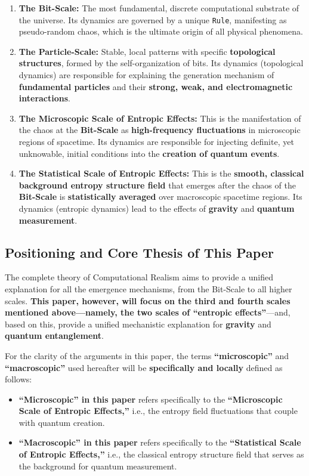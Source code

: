 \documentclass[11pt]{article}
\begin{document}
\begin{enumerate}
    \item   \textbf{The Bit-Scale:} The most fundamental, discrete computational substrate of the universe. Its dynamics are governed by a unique \texttt{Rule}, manifesting as pseudo-random chaos, which is the ultimate origin of all physical phenomena.
    
    \item   \textbf{The Particle-Scale:} Stable, local patterns with specific \textbf{topological structures}, formed by the self-organization of bits. Its dynamics (topological dynamics) are responsible for explaining the generation mechanism of \textbf{fundamental particles} and their \textbf{strong, weak, and electromagnetic interactions}.
    
    \item   \textbf{The Microscopic Scale of Entropic Effects:} This is the manifestation of the chaos at the \textbf{Bit-Scale} as \textbf{high-frequency fluctuations} in microscopic regions of spacetime. Its dynamics are responsible for injecting definite, yet unknowable, initial conditions into the \textbf{creation of quantum events}.
    
    \item   \textbf{The Statistical Scale of Entropic Effects:} This is the \textbf{smooth, classical background entropy structure field} that emerges after the chaos of the \textbf{Bit-Scale} is \textbf{statistically averaged} over macroscopic spacetime regions. Its dynamics (entropic dynamics) lead to the effects of \textbf{gravity} and \textbf{quantum measurement}.
\end{enumerate}

\subsection{Positioning and Core Thesis of This Paper}

The complete theory of Computational Realism aims to provide a unified explanation for all the emergence mechanisms, from the Bit-Scale to all higher scales. \textbf{This paper, however, will focus on the third and fourth scales mentioned above—namely, the two scales of ``entropic effects''}—and, based on this, provide a unified mechanistic explanation for \textbf{gravity} and \textbf{quantum entanglement}.

For the clarity of the arguments in this paper, the terms \textbf{``microscopic''} and \textbf{``macroscopic''} used hereafter will be \textbf{specifically and locally} defined as follows:
\begin{itemize}
    \item   \textbf{``Microscopic'' in this paper} refers specifically to the \textbf{``Microscopic Scale of Entropic Effects,''} i.e., the entropy field fluctuations that couple with quantum creation.
    \item   \textbf{``Macroscopic'' in this paper} refers specifically to the \textbf{``Statistical Scale of Entropic Effects,''} i.e., the classical entropy structure field that serves as the background for quantum measurement.
\end{itemize}
\end{document}
